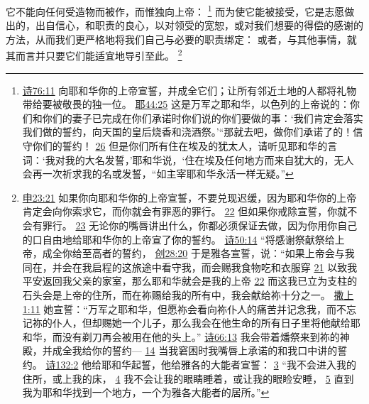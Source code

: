 \documentclass[12pt, a4paper, oneside]{ctexart}
\newcounter{parnum}[section]
\newcommand{\N}{%
   \noindent\refstepcounter{parnum}%
    \makebox[\parindent][l]{\textbf{\arabic{parnum}.}}}
\begin{document}
\N 它不能向任何受造物而被作，而惟独向上帝：
	\footnote {
		\href{https://biblehub.com/psalms/76-11.htm}{诗76:11} 向耶和华你的上帝宣誓，并成全它们；让所有邻近土地的人都将礼物带给要被敬畏的独一位。
		\href{https://biblehub.com/jeremiah/44-25.htm}{耶44:25} 这是万军之耶和华，以色列的上帝说的：你们和你们的妻子已完成在你们承诺时你们说的你们要做的事：‘我们肯定会落实我们做的誓约，向天国的皇后烧香和浇酒祭。’“那就去吧，做你们承诺了的！信守你们的誓约！
		\href{https://biblehub.com/jeremiah/44-26.htm}{26} 但是你们所有住在埃及的犹太人，请听见耶和华的言词：‘我对我的大名发誓，’耶和华说，‘住在埃及任何地方而来自犹大的，无人会再一次祈求我的名或发誓，“如主宰耶和华永活一样无疑。”
	}
	而为使它能被接受，它是志愿做出的，出自信心，和职责的良心，以对领受的宽恕，或对我们想要的得偿的感谢的方法，从而我们更严格地将我们自己与必要的职责绑定： 或者，与其他事情，就其而言并只要它们能适宜地导引至此。
	\footnote {
		\href{https://biblehub.com/deuteronomy/23-21.htm}{申23:21} 如果你向耶和华你的上帝宣誓，不要兑现迟缓，因为耶和华你的上帝肯定会向你索求它，而你就会有罪恶的罪行。
		\href{https://biblehub.com/deuteronomy/23-22.htm}{22} 但如果你戒除宣誓，你就不会有罪行。
		\href{https://biblehub.com/deuteronomy/23-23.htm}{23} 无论你的嘴唇讲出什么，你都必须保证去做，因为你用你自己的口自由地给耶和华你的上帝宣了你的誓约。
		\href{https://biblehub.com/psalms/50-14.htm}{诗50:14} “将感谢祭献祭给上帝，成全你给至高者的誓约，
		\href{https://biblehub.com/genesis/28-20.htm}{创28:20} 于是雅各宣誓，说：“如果上帝会与我同在，并会在我启程的这旅途中看守我，而会赐我食物吃和衣服穿
		\href{https://biblehub.com/genesis/28-21.htm}{21} 以致我平安返回我父亲的家室，那么耶和华就会是我的上帝
		\href{https://biblehub.com/genesis/28-22.htm}{22} 而这我已立为支柱的石头会是上帝的住所，而在祢赐给我的所有中，我会献给祢十分之一。
		\href{https://biblehub.com/1_samuel/1-11.htm}{撒上1:11} 她宣誓：“万军之耶和华，但愿祢会看向祢仆人的痛苦并记念我，而不忘记祢的仆人，但却赐她一个儿子，那么我会在他生命的所有日子里将他献给耶和华，而没有剃刀再会被用在他的头上。”
		\href{https://biblehub.com/psalms/66-13.htm}{诗66:13} 我会带着燔祭来到祢的神殿，并成全我给你的誓约---
		\href{https://biblehub.com/psalms/66-14.htm}{14} 当我窘困时我嘴唇上承诺的和我口中讲的誓约。
		\href{https://biblehub.com/psalms/132-2.htm}{诗132:2} 他给耶和华起誓，他给雅各的大能者宣誓：
		\href{https://biblehub.com/psalms/132-3.htm}{3} “我不会进入我的住所，或上我的床，
		\href{https://biblehub.com/psalms/132-4.htm}{4} 我不会让我的眼睛睡着，或让我的眼睑安睡，
		\href{https://biblehub.com/psalms/132-5.htm}{5} 直到我为耶和华找到一个地方，一个为雅各大能者的居所。”
	}
\end{document}

